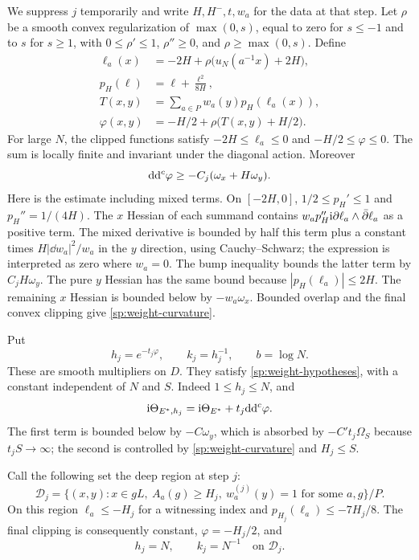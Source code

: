 We suppress $j$ temporarily and write $H,H^-,t,w_a$ for the data at
that step.  Let $\rho$ be a smooth convex regularization of
$\max(0,s)$, equal to zero for $s\le-1$ and to $s$ for $s\ge1$,
with $0\le\rho'\le1$, $\rho''\ge0$, and $\rho\ge\max(0,s)$.
Define
\begin{align*}
 \ell_a(x)&=-2H+\rho\bigl(u_N(a^{-1}x)+2H\bigr),\\
 p_H(\ell)&=\ell+\frac{\ell^2}{8H},\\
 T(x,y)&=\sum_{a\in P}w_a(y)p_H(\ell_a(x)),\\
 \varphi(x,y)&=-H/2+\rho\bigl(T(x,y)+H/2\bigr).
\end{align*}
For large $N$, the clipped functions satisfy
$-2H\le\ell_a\le0$ and $-H/2\le\varphi\le0$.
The sum is locally finite and invariant under the diagonal action.
Moreover
\begin{equation}\label{sp:weight-curvature}
 \mathrm d\mathrm d^c\varphi\ge-C_j(\omega_x+H\omega_y).
\end{equation}
Here is the estimate including mixed terms.  On $[-2H,0]$,
$1/2\le p_H'\le1$ and $p_H''=1/(4H)$.  The $x$ Hessian of each
summand contains
$w_ap_H''\mathrm i\partial\ell_a\wedge\bar\partial\ell_a$ as a positive
term.  The mixed derivative is bounded by half this term plus a
constant times
$H|\dd w_a|^2/w_a$ in the $y$ direction, using Cauchy--Schwarz;
the expression is interpreted as zero where $w_a=0$.  The bump
inequality bounds the latter term by $C_jH\omega_y$.  The pure $y$
Hessian has the same bound because $|p_H(\ell_a)|\le2H$.
The remaining $x$ Hessian is bounded below by $-w_a\omega_x$.
Bounded overlap and the final convex clipping give
\eqref{sp:weight-curvature}.

Put
\begin{equation}\label{sp:actual-weights}
 h_j=e^{-t_j\varphi},\qquad k_j=h_j^{-1},\qquad b=\log N.
\end{equation}
These are smooth multipliers on $D$.  They satisfy
\eqref{sp:weight-hypotheses}, with a constant independent of $N$ and
$S$.  Indeed $1\le h_j\le N$, and
\[
 \mathrm i\Theta_{E^*,h_j}
 =\mathrm i\Theta_{E^*}+t_j\mathrm d\mathrm d^c\varphi.
\]
The first term is bounded below by $-C\omega_y$, which is absorbed
by $-C't_j\Omega_S$ because $t_jS\to\infty$; the second is controlled
by \eqref{sp:weight-curvature} and $H_j\le S$.

Call the following set the deep region at step $j$:
\begin{equation}\label{sp:deep-region}
 \mathcal D_j=\{(x,y): x\in gL,\ A_a(g)\ge H_j,
                       \ w_a^{(j)}(y)=1
                       \text{ for some }a,g\}/P.
\end{equation}
On this region $\ell_a\le-H_j$ for a witnessing index and
$p_{H_j}(\ell_a)\le-7H_j/8$.  The final clipping is consequently
constant, $\varphi=-H_j/2$, and
\begin{equation}\label{sp:deep-weight}
 h_j=N,\qquad k_j=N^{-1}\quad\text{on }\mathcal D_j.
\end{equation}


